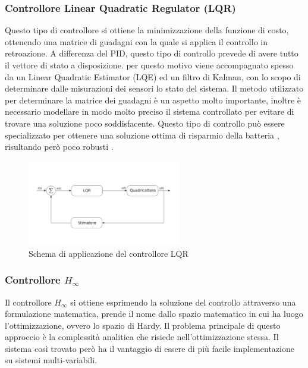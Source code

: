 \subsubsection{Controllore Linear Quadratic Regulator (LQR)}
Questo tipo di controllore si ottiene la minimizzazione della funzione di costo, ottenendo una matrice di guadagni con la quale si applica il controllo in retroazione. A differenza del PID, questo tipo di controllo prevede di avere tutto il vettore di stato a disposizione. per questo motivo viene accompagnato spesso da un Linear Quadratic Estimator (LQE) ed un filtro di Kalman, con lo scopo di determinare dalle misurazioni dei sensori lo stato del sistema. Il metodo utilizzato per determinare la matrice dei guadagni è un aspetto molto importante, inoltre è necessario modellare in modo molto preciso il sistema controllato per evitare di trovare una soluzione poco soddisfacente. Questo tipo di controllo può essere specializzato per ottenere una soluzione ottima di risparmio della batteria \cite{KoksalN2018ALQA}, risultando però poco robusti \cite{ZuluAndrew2014ARoC}.

\begin{figure}
	\centering
	\includegraphics[width=0.6\textwidth]{SistemaQuadrirotore/Figure/LQR}
	\caption{Schema di applicazione del controllore LQR}
\end{figure}
 

\subsubsection{Controllore $H_\infty$}

Il controllore $H_\infty$ si ottiene esprimendo la soluzione del controllo attraverso una formulazione matematica, prende il nome dallo spazio matematico in cui ha luogo l'ottimizzazione, ovvero lo spazio di Hardy. Il problema principale di questo approccio è la complessità analitica che risiede nell'ottimizzazione stessa. Il sistema così trovato però ha il vantaggio di essere di più facile implementazione su sistemi multi-variabili. 

